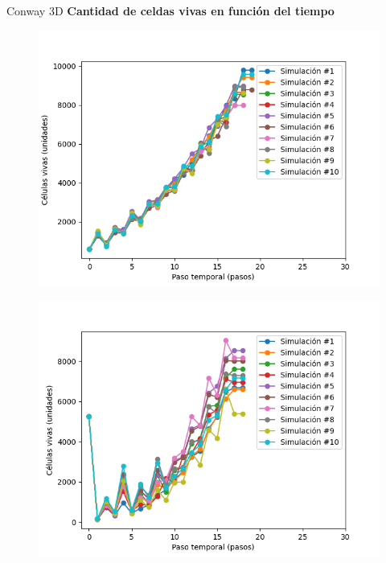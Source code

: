 \begin{frame}{Conway 3D}
    \textbf{Cantidad de celdas vivas en función del tiempo}
    \begin{multicols}{2}
        {
            \begin{figure}[H]
                \centering
                \includegraphics[width=0.8\linewidth]{pic/conway3d/size_i10}
                \label{fig:conway3d:size:i10}
            \end{figure}
        }

        {
            \begin{figure}[H]
                \centering
                \includegraphics[width=0.8\linewidth]{pic/conway3d/size_i90}
                \label{fig:conway3d:size:i90}
            \end{figure}
        }
    \end{multicols}
\end{frame}

